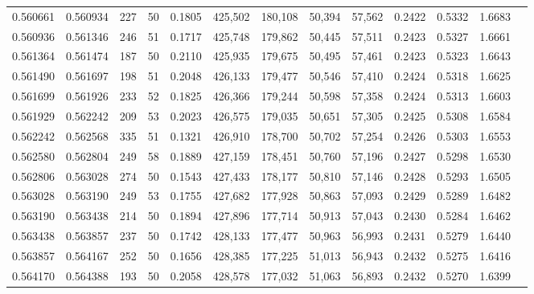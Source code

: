 \begin{tabular}{rrrrrrrrrrrrr}
0.560661 & 0.560934 &   227 &  50 &                                     0.1805 & 425,502 & 180,108 &  50,394 &  57,562 & 0.2422 & 0.5332 & 1.6683 \\
0.560936 & 0.561346 &   246 &  51 &                                     0.1717 & 425,748 & 179,862 &  50,445 &  57,511 & 0.2423 & 0.5327 & 1.6661 \\
0.561364 & 0.561474 &   187 &  50 &                                     0.2110 & 425,935 & 179,675 &  50,495 &  57,461 & 0.2423 & 0.5323 & 1.6643 \\
0.561490 & 0.561697 &   198 &  51 &                                     0.2048 & 426,133 & 179,477 &  50,546 &  57,410 & 0.2424 & 0.5318 & 1.6625 \\
0.561699 & 0.561926 &   233 &  52 &                                     0.1825 & 426,366 & 179,244 &  50,598 &  57,358 & 0.2424 & 0.5313 & 1.6603 \\
0.561929 & 0.562242 &   209 &  53 &                                     0.2023 & 426,575 & 179,035 &  50,651 &  57,305 & 0.2425 & 0.5308 & 1.6584 \\
0.562242 & 0.562568 &   335 &  51 &                                     0.1321 & 426,910 & 178,700 &  50,702 &  57,254 & 0.2426 & 0.5303 & 1.6553 \\
0.562580 & 0.562804 &   249 &  58 &                                     0.1889 & 427,159 & 178,451 &  50,760 &  57,196 & 0.2427 & 0.5298 & 1.6530 \\
0.562806 & 0.563028 &   274 &  50 &                                     0.1543 & 427,433 & 178,177 &  50,810 &  57,146 & 0.2428 & 0.5293 & 1.6505 \\
0.563028 & 0.563190 &   249 &  53 &                                     0.1755 & 427,682 & 177,928 &  50,863 &  57,093 & 0.2429 & 0.5289 & 1.6482 \\
0.563190 & 0.563438 &   214 &  50 &                                     0.1894 & 427,896 & 177,714 &  50,913 &  57,043 & 0.2430 & 0.5284 & 1.6462 \\
0.563438 & 0.563857 &   237 &  50 &                                     0.1742 & 428,133 & 177,477 &  50,963 &  56,993 & 0.2431 & 0.5279 & 1.6440 \\
0.563857 & 0.564167 &   252 &  50 &                                     0.1656 & 428,385 & 177,225 &  51,013 &  56,943 & 0.2432 & 0.5275 & 1.6416 \\
0.564170 & 0.564388 &   193 &  50 &                                     0.2058 & 428,578 & 177,032 &  51,063 &  56,893 & 0.2432 & 0.5270 & 1.6399 \\

\end{tabular}
